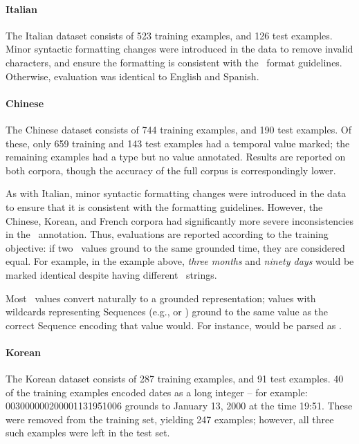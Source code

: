 \paragraph{Italian}
The Italian dataset consists of 523 training examples, and 126 test examples.
Minor syntactic formatting changes were introduced in the data to remove invalid
  characters, and ensure the formatting is consistent with the
  \tempeval\ format guidelines.
Otherwise, evaluation was identical to English and Spanish.

\paragraph{Chinese}
The Chinese dataset consists of 744 training examples, and 190 test examples.
Of these, only 659 training and 143 test examples had a temporal value marked;
  the remaining examples had a type but no value annotated.
Results are reported on both corpora, though the accuracy of the full corpus
  is correspondingly lower.

As with Italian, minor syntactic formatting changes were introduced in the data
  to ensure that it is consistent with the formatting guidelines.
However, the Chinese, Korean, and French corpora had significantly more severe
  inconsistencies in the \timex\ annotation.
Thus, evaluations are reported according to the training objective: if two
  \timex\ values ground to the same grounded time, they are considered equal.
For example, in the example above, \textit{three months} and \textit{ninety
  days} would be marked identical despite having different \timex\ strings.

Most \timex\ values convert naturally to a grounded representation; values
  with wildcards representing Sequences (e.g.,  or )
  ground to the same value as the correct Sequence encoding that value would.
For instance,  would be parsed as .

\paragraph{Korean}
The Korean dataset consists of 287 training examples, and 91 test examples.
40 of the training examples encoded dates as a long integer -- for
  example: 003000000200001131951006 grounds to January 13, 2000 at the time
  19:51.
These were removed from the training set, yielding 247 examples; however,
  all three such examples were left in the test set.

